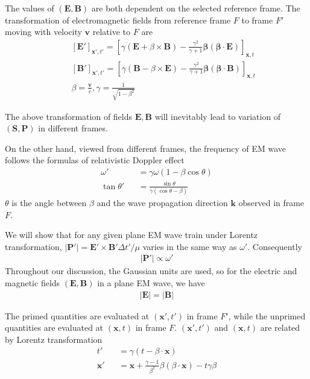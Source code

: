 \documentclass[prd,showpacs,twocolumn]{revtex4-1}
\begin{document}
The values of $(\mathbf{E}, \mathbf{B})$ are both dependent on the selected reference frame. The transformation of electromagnetic fields from reference frame $F$ to frame $F'$ moving with velocity $\mathbf{v}$ relative to $F$ are \cite{Jackson}
\begin{eqnarray}
&&[\mathbf{E'}]_{\mathbf{x'},t'}=[\gamma(\mathbf{E}+\beta\times \mathbf{B})-\frac{\gamma^2}{\gamma+1}\mathbf{\beta}(\mathbf{\beta}\cdot \mathbf{E})]_{\mathbf{x},t}\nonumber\\
&&[\mathbf{B'}]_{\mathbf{x'},t'}=[\gamma(\mathbf{B}-\beta\times \mathbf{E})-\frac{\gamma^2}{\gamma+1}\mathbf{\beta}(\mathbf{\beta}\cdot \mathbf{B})]_{\mathbf{x},t}\nonumber\\
&&\beta=\frac{\mathbf{v}}{c},\gamma=\frac{1}{\sqrt{1-\beta^2}}
\label{eqn:E1B1}
\end{eqnarray}

The above transformation of fields $\mathbf{E}, \mathbf{B}$ will inevitably lead to variation of $(\mathbf{S}, \mathbf{P})$ in different frames.

On the other hand, viewed from different frames, the frequency of EM wave follows the formulas of relativistic Doppler effect
\begin{eqnarray}
\omega'&&=\gamma\omega(1-\beta\cos\theta)\nonumber\\
\tan\theta'&&=\frac{\sin\theta}{\gamma(\cos\theta-\beta)}
\label{eqn:Doppler}
\end{eqnarray}
$\theta$ is the angle between $\beta$ and the wave propagation direction $\mathbf{k}$ observed in frame $F$.

We will show that for any given plane EM wave train under Lorentz transformation, $|\mathbf{P}'|=\mathbf{E}'\times\mathbf{B}'\Delta t'/\mu$ varies in the same way as $\omega'$. Consequently
\begin{eqnarray}
|\mathbf{P}'|\propto\omega'
\label{eqn:main1}
\end{eqnarray}
Throughout our discussion, the Gaussian units are used, so for the electric and magnetic fields $(\mathbf{E}, \mathbf{B})$ in a plane EM wave, we have
\begin{eqnarray}
|\mathbf{E}|=|\mathbf{B}|
\label{eqn:convention}
\end{eqnarray}

The primed quantities are evaluated at $(\mathbf{x'},t')$ in frame $F'$, while the unprimed quantities are evaluated at $(\mathbf{x},t)$ in frame $F$. $(\mathbf{x'},t')$ and $(\mathbf{x},t)$ are related by Lorentz transformation
\begin{eqnarray}
t'&&=\gamma(t-\beta\cdot\mathbf{x})\nonumber\\
\mathbf{x'}&&=\mathbf{x}+\frac{\gamma-1}{\beta^2}\beta(\beta\cdot\mathbf{x})-t\gamma\beta
\end{eqnarray}
\end{document}
